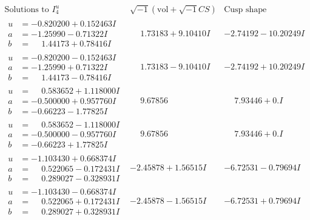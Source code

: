 \documentclass[1p]{elsarticle_modified}
\theoremstyle{definition}
\newcommand{\I}{\sqrt{-1}}
\begin{document}
$$\begin{array}{c|c|c}  
\text{Solutions to }I^u_{4}& \I (\text{vol} + \sqrt{-1}CS) & \text{Cusp shape}\\
 \hline 
\begin{aligned}
u &= -0.820200 + 0.152463 I \\
a &= -1.25990 - 0.71322 I \\
b &= \phantom{-}1.44173 + 0.78416 I\end{aligned}
 & \phantom{-}1.73183 + 9.10410 I & -2.74192 - 10.20249 I \\ \hline\begin{aligned}
u &= -0.820200 - 0.152463 I \\
a &= -1.25990 + 0.71322 I \\
b &= \phantom{-}1.44173 - 0.78416 I\end{aligned}
 & \phantom{-}1.73183 - 9.10410 I & -2.74192 + 10.20249 I \\ \hline\begin{aligned}
u &= \phantom{-}0.583652 + 1.118000 I \\
a &= -0.500000 + 0.957760 I \\
b &= -0.66223 - 1.77825 I\end{aligned}
 & \phantom{-}9.67856\phantom{ +0.000000I} & \phantom{-}7.93446 + 0. I\phantom{ +0.000000I} \\ \hline\begin{aligned}
u &= \phantom{-}0.583652 - 1.118000 I \\
a &= -0.500000 - 0.957760 I \\
b &= -0.66223 + 1.77825 I\end{aligned}
 & \phantom{-}9.67856\phantom{ +0.000000I} & \phantom{-}7.93446 + 0. I\phantom{ +0.000000I} \\ \hline\begin{aligned}
u &= -1.103430 + 0.668374 I \\
a &= \phantom{-}0.522065 - 0.172431 I \\
b &= \phantom{-}0.289027 - 0.328931 I\end{aligned}
 & -2.45878 + 1.56515 I & -6.72531 - 0.79694 I \\ \hline\begin{aligned}
u &= -1.103430 - 0.668374 I \\
a &= \phantom{-}0.522065 + 0.172431 I \\
b &= \phantom{-}0.289027 + 0.328931 I\end{aligned}
 & -2.45878 - 1.56515 I & -6.72531 + 0.79694 I \\ \hline\begin{aligned}

\end{aligned}
\end{array}$$
\end{document}
